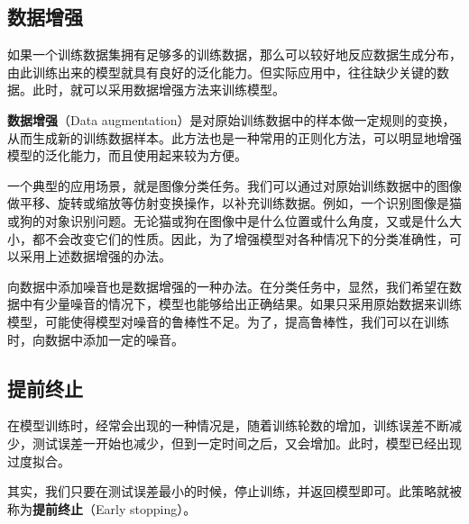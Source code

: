 \subsection{数据增强}

如果一个训练数据集拥有足够多的训练数据，那么可以较好地反应数据生成分布，由此训练出来的模型就具有良好的泛化能力。但实际应用中，往往缺少关键的数据。此时，就可以采用数据增强方法来训练模型。

\textbf{数据增强}（Data augmentation）是对原始训练数据中的样本做一定规则的变换，从而生成新的训练数据样本。此方法也是一种常用的正则化方法，可以明显地增强模型的泛化能力，而且使用起来较为方便。

一个典型的应用场景，就是图像分类任务。我们可以通过对原始训练数据中的图像做平移、旋转或缩放等仿射变换操作，以补充训练数据。例如，一个识别图像是猫或狗的对象识别问题。无论猫或狗在图像中是什么位置或什么角度，又或是什么大小，都不会改变它们的性质。因此，为了增强模型对各种情况下的分类准确性，可以采用上述数据增强的办法。

向数据中添加噪音也是数据增强的一种办法。在分类任务中，显然，我们希望在数据中有少量噪音的情况下，模型也能够给出正确结果。如果只采用原始数据来训练模型，可能使得模型对噪音的鲁棒性不足。为了，提高鲁棒性，我们可以在训练时，向数据中添加一定的噪音。


\subsection{提前终止}

在模型训练时，经常会出现的一种情况是，随着训练轮数的增加，训练误差不断减少，测试误差一开始也减少，但到一定时间之后，又会增加。此时，模型已经出现过度拟合。

其实，我们只要在测试误差最小的时候，停止训练，并返回模型即可。此策略就被称为\textbf{提前终止}（Early stopping）。